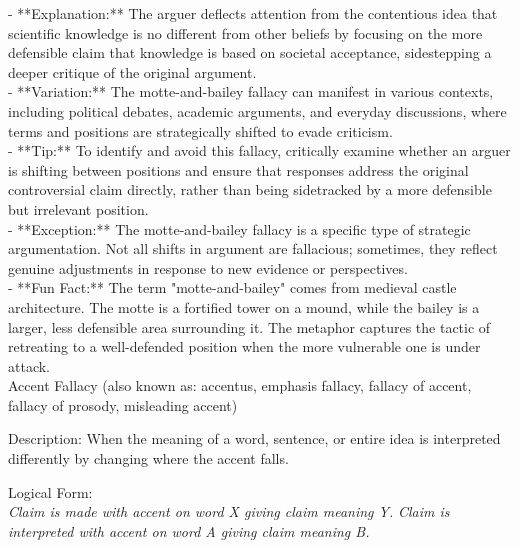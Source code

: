 \documentclass[a4paper,12pt,single,pdftex]{scrartcl}
\begin{document}
    
      - **Explanation:** The arguer deflects attention from the contentious idea that scientific knowledge is no different from other beliefs by focusing on the more defensible claim that knowledge is based on societal acceptance, sidestepping a deeper critique of the original argument.
    \\

    
      - **Variation:** The motte-and-bailey fallacy can manifest in various contexts, including political debates, academic arguments, and everyday discussions, where terms and positions are strategically shifted to evade criticism.
    \\

    
      - **Tip:** To identify and avoid this fallacy, critically examine whether an arguer is shifting between positions and ensure that responses address the original controversial claim directly, rather than being sidetracked by a more defensible but irrelevant position.
    \\

    
      - **Exception:** The motte-and-bailey fallacy is a specific type of strategic argumentation. Not all shifts in argument are fallacious; sometimes, they reflect genuine adjustments in response to new evidence or perspectives.
    \\

    
      - **Fun Fact:** The term "motte-and-bailey" comes from medieval castle architecture. The motte is a fortified tower on a mound, while the bailey is a larger, less defensible area surrounding it. The metaphor captures the tactic of retreating to a well-defended position when the more vulnerable one is under attack.
    \\

  

Accent Fallacy
    (also known as: accentus, emphasis fallacy, fallacy of accent, fallacy of prosody, misleading accent)
  
    Description: When the meaning of a word, sentence, or entire idea is interpreted differently by changing where the accent falls. \newline


    
      Logical Form:
    \\

    
      {\em Claim is made with accent on word X giving claim meaning Y.} \newline
{\em Claim is interpreted with accent on word A giving claim meaning B.}
    \\
\end{document}
